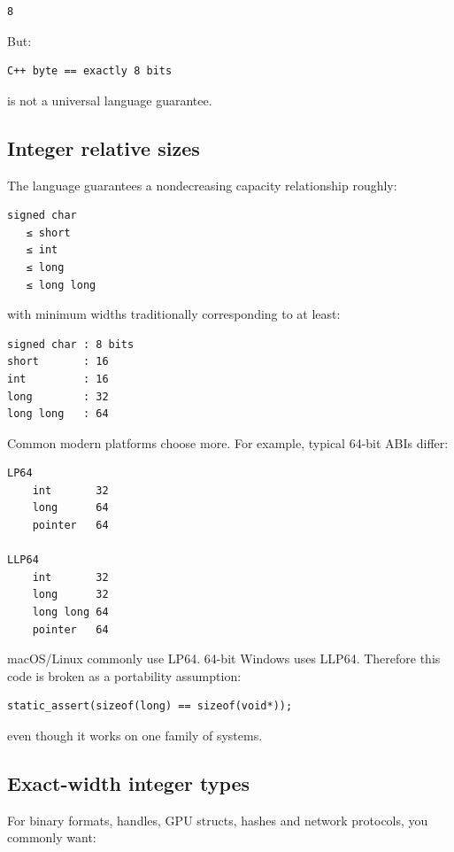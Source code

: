 \begin{verbatim}
8
\end{verbatim}

But:

\begin{verbatim}
C++ byte == exactly 8 bits
\end{verbatim}

is not a universal language guarantee.

\subsection{Integer relative sizes}\label{05-engine-i-ch002-integer-relative-sizes}

The language guarantees a nondecreasing capacity relationship roughly:

\begin{verbatim}
signed char
   ≤ short
   ≤ int
   ≤ long
   ≤ long long
\end{verbatim}

with minimum widths traditionally corresponding to at least:

\begin{verbatim}
signed char : 8 bits
short       : 16
int         : 16
long        : 32
long long   : 64
\end{verbatim}

Common modern platforms choose more. For example, typical 64-bit ABIs differ:

\begin{verbatim}
LP64
    int       32
    long      64
    pointer   64

LLP64
    int       32
    long      32
    long long 64
    pointer   64
\end{verbatim}

macOS/Linux commonly use LP64. 64-bit Windows uses LLP64. Therefore this code is broken as a portability assumption:

\begin{verbatim}
static_assert(sizeof(long) == sizeof(void*));
\end{verbatim}

even though it works on one family of systems.

\subsection{Exact-width integer types}\label{05-engine-i-ch002-exact-width-integer-types}

For binary formats, handles, GPU structs, hashes and network protocols, you commonly want:

